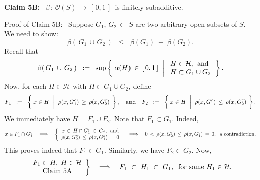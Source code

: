 \vskip 0.2cm
\begin{center}
\begin{minipage}{6.5in}
\textbf{Claim 5B:} \,
$\beta \,:\, \mathcal{O}(S) \,\longrightarrow\, [\,0,1\,]$\, is finitely subadditive.
\end{minipage}
\end{center}
Proof of Claim 5B: \,
Suppose $G_{1}, \, G_{2} \,\subset\, S$ are two arbitrary open subsets of $S$.
We need to show:
\begin{equation*}
\beta\!\left(\,G_{1}\,\cup\,G_{2}\,\right) \;\; \leq \;\; \beta\!\left(G_{1}\right) \;+\; \beta\!\left(G_{2}\right).
\end{equation*}
Recall that
\begin{equation*}
\beta\!\left(\,G_{1}\,\cup\,G_{2}\,\right)
\;\; := \;\;
\sup\left\{\;
	\alpha(H) \,\in\, [\,0,1\,]
	\,\;\left\vert\;
		\begin{array}{l} H \in \mathcal{H}, \;\,\textnormal{and} \\ H \subset G_{1} \cup G_{2} \end{array}
	\right.
\right\}.
\end{equation*}
Now, for each $H \in \mathcal{H}$ with $H \subset G_{1} \cup G_{2}$, define
\begin{equation*}
F_{1}
\;\;:=\;\; \left\{\;x \in H \;\,\left\vert\;\; \rho(x,G_{1}^{c}) \,\overset{{\color{white}-}}{\geq}\, \rho(x,G_{2}^{c}) \right.\;\right\},
\quad\textnormal{and}\quad
F_{2}
\;\;:=\;\; \left\{\;x \in H \;\,\left\vert\;\; \rho(x,G_{1}^{c}) \,\overset{{\color{white}-}}{\leq}\, \rho(x,G_{2}^{c}) \right.\;\right\}.
\end{equation*}
We immediately have $H = F_{1} \cup F_{2}$.
Note that $F_{1} \subset G_{1}$.
Indeed,
\begin{equation*}
x \in F_{1} \cap G_{1}^{c}
\quad\Longrightarrow\quad
\left\{
	\begin{array}{c}
	x \,\in\, H \cap G_{1}^{c} \,\subset\, G_{2}, \;\,\textnormal{and}
	\\
	\rho(x,G_{2}^{c}) \,\leq\, \rho(x,G_{1}^{c}) \,=\, 0	
	\end{array}
\right.
\quad\Longrightarrow\quad
0 \,<\, \rho(x,G_{2}^{c}) \,\leq\, \rho(x,G_{1}^{c}) \,=\, 0,
\;\;\textnormal{a contradiction}.
\end{equation*}
This proves indeed that $F_{1} \subset G_{1}$.
Similarly, we have $F_{2} \subset G_{2}$.
Now,
\begin{equation*}
\left.
	\begin{array}{c}
	F_{1} \subset H,\; H \in \mathcal{H}
	\\
	\textnormal{Claim 5A}
	\end{array}
\right\}
\quad\Longrightarrow\quad
F_{1} \;\subset\; H_{1} \;\subset\; G_{1},
\;\;\textnormal{for some $H_{1} \in \mathcal{H}$}.
\end{equation*}
